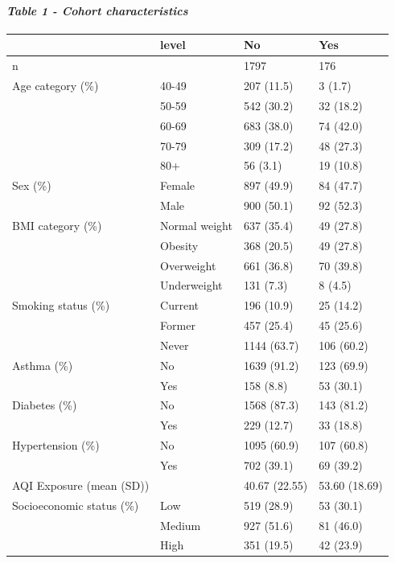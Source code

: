 \documentclass[
]{article}
\begin{document}
\paragraph{\texorpdfstring{\emph{Table 1 - Cohort
characteristics}}{Table 1 - Cohort characteristics}}\label{table-1---cohort-characteristics}

\begin{longtable}[]{@{}llll@{}}
\toprule\noalign{}
& level & No & Yes \\
\midrule\noalign{}
\endhead
\bottomrule\noalign{}
\endlastfoot
n & & 1797 & 176 \\
Age category (\%) & 40-49 & 207 (11.5) & 3 (1.7) \\
& 50-59 & 542 (30.2) & 32 (18.2) \\
& 60-69 & 683 (38.0) & 74 (42.0) \\
& 70-79 & 309 (17.2) & 48 (27.3) \\
& 80+ & 56 (3.1) & 19 (10.8) \\
Sex (\%) & Female & 897 (49.9) & 84 (47.7) \\
& Male & 900 (50.1) & 92 (52.3) \\
BMI category (\%) & Normal weight & 637 (35.4) & 49 (27.8) \\
& Obesity & 368 (20.5) & 49 (27.8) \\
& Overweight & 661 (36.8) & 70 (39.8) \\
& Underweight & 131 (7.3) & 8 (4.5) \\
Smoking status (\%) & Current & 196 (10.9) & 25 (14.2) \\
& Former & 457 (25.4) & 45 (25.6) \\
& Never & 1144 (63.7) & 106 (60.2) \\
Asthma (\%) & No & 1639 (91.2) & 123 (69.9) \\
& Yes & 158 (8.8) & 53 (30.1) \\
Diabetes (\%) & No & 1568 (87.3) & 143 (81.2) \\
& Yes & 229 (12.7) & 33 (18.8) \\
Hypertension (\%) & No & 1095 (60.9) & 107 (60.8) \\
& Yes & 702 (39.1) & 69 (39.2) \\
AQI Exposure (mean (SD)) & & 40.67 (22.55) & 53.60 (18.69) \\
Socioeconomic status (\%) & Low & 519 (28.9) & 53 (30.1) \\
& Medium & 927 (51.6) & 81 (46.0) \\
& High & 351 (19.5) & 42 (23.9) \\
\end{longtable}
\end{document}
